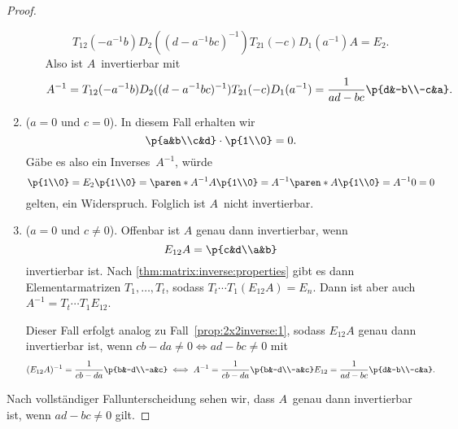 \documentclass[a4paper]{article}
\begin{document}
\begin{proof}
\begin{enumerate}[{Fall}~1, leftmargin=*]
\begin{enumerate}[{Fall~2}a, leftmargin=*]
                        \begin{equation*}
                            T_{12}(-a^{-1}b) D_2((d-a^{-1}bc)^{-1}) T_{21}(-c) D_1(a^{-1}) A = E_2.
                        \end{equation*}
                        Also ist $A$~invertierbar mit
                        \begin{equation*}
                            A^{-1} = T_{12}(-a^{-1}b) D_2((d-a^{-1}bc)^{-1}) T_{21}(-c) D_1(a^{-1}) = \frac{1}{ad-bc} \p{d&-b\\-c&a}.
                        \end{equation*}
              \end{enumerate}\label{prop:2x2inverse:1}
        \item ($a = 0$ und $c = 0$). In diesem Fall erhalten wir
              \begin{equation*}
                  \p{a&b\\c&d} \cdot \p{1\\0} = 0.
              \end{equation*}
              Gäbe es also ein Inverses~$A^{-1}$, würde
              \begin{equation*}
                  \p{1\\0} = E_2\p{1\\0} = \paren*{A^{-1}A} \p{1\\0} = A^{-1} \paren*{A\p{1\\0}} = A^{-1}0 = 0
              \end{equation*}
              gelten, ein Widerspruch. Folglich ist $A$~nicht invertierbar.
        \item ($a = 0$ und $c \neq 0$). Offenbar ist $A$ genau dann invertierbar, wenn
              \begin{equation*}
                  E_{12}A = \p{c&d\\a&b}
              \end{equation*}
              invertierbar ist. Nach \cref{thm:matrix:inverse:properties} gibt es dann Elementarmatrizen $T_1,\dots,T_t$, sodass $T_t\cdots T_1(E_{12}A) = E_n$. Dann ist aber auch $A^{-1} = T_t\cdots T_1E_{12}$.

              Dieser Fall erfolgt analog zu Fall~\ref{prop:2x2inverse:1}, sodass $E_{12}A$ genau dann invertierbar ist, wenn $cb-da \neq 0 \iff ad-bc \neq 0$ mit
              \begin{equation*}
                  (E_{12}A)^{-1} = \frac{1}{cb-da} \p{b&-d\\-a&c} \iff A^{-1} = \frac{1}{cb-da} \p{b&-d\\-a&c} E_{12} = \frac{1}{ad-bc} \p{d&-b\\-c&a}.
              \end{equation*}
    \end{enumerate}
    Nach vollständiger Fallunterscheidung sehen wir, dass $A$~genau dann invertierbar ist, wenn $ad-bc \neq 0$ gilt.
\end{proof}
\end{document}
